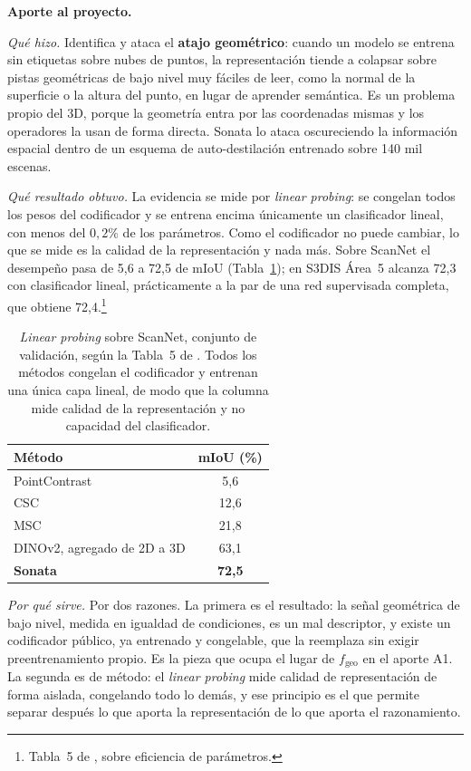 \textbf{Aporte al proyecto.}

\emph{Qué hizo.} Identifica y ataca el \textbf{atajo geométrico}: cuando un
modelo se entrena sin etiquetas sobre nubes de puntos, la representación tiende a
colapsar sobre pistas geométricas de bajo nivel muy fáciles de leer, como la
normal de la superficie o la altura del punto, en lugar de aprender semántica. Es
un problema propio del 3D, porque la geometría entra por las coordenadas mismas y
los operadores la usan de forma directa. Sonata lo ataca oscureciendo la
información espacial dentro de un esquema de auto-destilación entrenado sobre 140
mil escenas.

\emph{Qué resultado obtuvo.} La evidencia se mide por \emph{linear probing}: se
congelan todos los pesos del codificador y se entrena encima únicamente un
clasificador lineal, con menos del $0{,}2$\% de los parámetros. Como el
codificador no puede cambiar, lo que se mide es la calidad de la representación y
nada más. Sobre ScanNet el desempeño pasa de 5,6 a 72,5 de mIoU
(Tabla~\ref{tab:linprobe}); en S3DIS Área~5 alcanza 72,3 con clasificador lineal,
prácticamente a la par de una red supervisada completa, que obtiene
72,4.\footnote{Tabla~5 de \cite{wu2025sonata}, sobre eficiencia de parámetros.}

\begin{table}[htbp]
\centering
\caption{\emph{Linear probing} sobre ScanNet, conjunto de validación, según la
Tabla~5 de \cite{wu2025sonata}. Todos los métodos congelan el codificador y
entrenan una única capa lineal, de modo que la columna mide calidad de la
representación y no capacidad del clasificador.}
\label{tab:linprobe}
\begin{tabular}{lc}
\hline
Método & mIoU (\%) \\
\hline
PointContrast & 5,6 \\
CSC & 12,6 \\
MSC & 21,8 \\
DINOv2, agregado de 2D a 3D & 63,1 \\
\textbf{Sonata} & \textbf{72,5} \\
\hline
\end{tabular}
\end{table}

\emph{Por qué sirve.} Por dos razones. La primera es el resultado: la señal
geométrica de bajo nivel, medida en igualdad de condiciones, es un mal
descriptor, y existe un codificador público, ya entrenado y congelable, que la
reemplaza sin exigir preentrenamiento propio. Es la pieza que ocupa el lugar de
$f_{\text{geo}}$ en el aporte A1. La segunda es de método: el \emph{linear
probing} mide calidad de representación de forma aislada, congelando todo lo
demás, y ese principio es el que permite separar después lo que aporta la
representación de lo que aporta el razonamiento.

